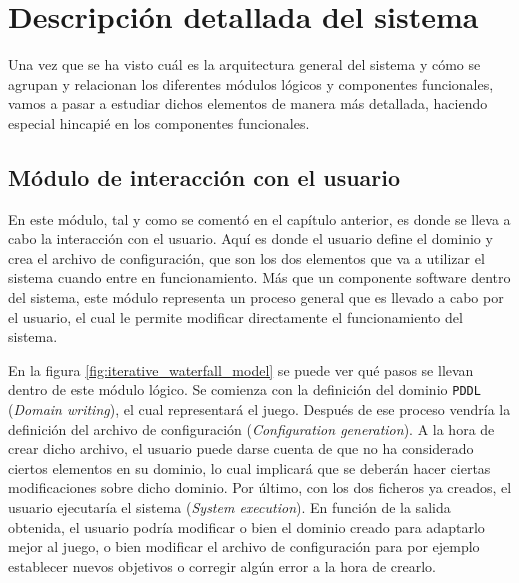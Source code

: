 
\chapter{Descripción detallada del sistema}

Una vez que se ha visto cuál es la arquitectura general del sistema y cómo se agrupan
y relacionan los diferentes módulos lógicos y componentes funcionales, vamos a pasar
a estudiar dichos elementos de manera más detallada, haciendo especial hincapié en los
componentes funcionales.

\section{Módulo de interacción con el usuario}

En este módulo, tal y como se comentó en el capítulo anterior, es donde se lleva a cabo
la interacción con el usuario. Aquí es donde el usuario define el dominio y crea el archivo
de configuración, que son los dos elementos que va a utilizar el sistema cuando entre en
funcionamiento. Más que un componente software dentro del sistema, este módulo representa un
proceso general que es llevado a cabo por el usuario, el cual le permite modificar directamente
el funcionamiento del sistema.

En la figura \ref{fig:iterative_waterfall_model} se puede ver qué pasos se llevan dentro de este
módulo lógico. Se comienza con la definición del dominio \texttt{PDDL} (\textit{Domain writing}), el cual
representará el juego. Después de ese proceso vendría la definición del archivo de configuración
(\textit{Configuration generation}). A la hora de crear dicho archivo, el usuario puede darse cuenta de que no ha
considerado ciertos elementos en su dominio, lo cual implicará que se deberán hacer ciertas modificaciones
sobre dicho dominio. Por último, con los dos ficheros ya creados, el usuario ejecutaría el sistema
(\textit{System execution}). En función de la salida obtenida, el usuario podría modificar o bien el
dominio creado para adaptarlo mejor al juego, o bien modificar el archivo de configuración para por ejemplo
establecer nuevos objetivos o corregir algún error a la hora de crearlo.

